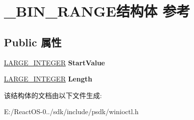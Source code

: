 \hypertarget{struct___b_i_n___r_a_n_g_e}{}\section{\+\_\+\+B\+I\+N\+\_\+\+R\+A\+N\+G\+E结构体 参考}
\label{struct___b_i_n___r_a_n_g_e}
\subsection*{Public 属性}
\begin{DoxyCompactItemize}
\item 
\mbox{\label{struct___b_i_n___r_a_n_g_e_a6f0fc72fe5c916808c0272d4153d3f3e}} 
\hyperlink{union___l_a_r_g_e___i_n_t_e_g_e_r}{L\+A\+R\+G\+E\+\_\+\+I\+N\+T\+E\+G\+ER} {\bfseries Start\+Value}
\item 
\mbox{\label{struct___b_i_n___r_a_n_g_e_a1c44d96c8309f67e446d4d82f69589fa}} 
\hyperlink{union___l_a_r_g_e___i_n_t_e_g_e_r}{L\+A\+R\+G\+E\+\_\+\+I\+N\+T\+E\+G\+ER} {\bfseries Length}
\end{DoxyCompactItemize}


该结构体的文档由以下文件生成\+:\begin{DoxyCompactItemize}
\item 
E\+:/\+React\+O\+S-\/0../sdk/include/psdk/winioctl.\+h\end{DoxyCompactItemize}
